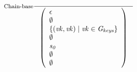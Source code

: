 \documentclass[11pt,a4paper]{article}
\newcommand{\var}[1]{\mathit{#1}}
\newcommand{\Gkeys}{\var{G_{keys}}}
\begin{document}
\begin{figure}
  \centering
  \begin{equation}
    \label{eq:rule:chain-base}
    \inference[Chain-base]
    {}
    {\left(
        \begin{array}{l}
          \epsilon\\
          \var{\emptyset}\\
          \var{\{ (\var{vk}, \var{vk}) \mid \var{vk} \in \Gkeys\}}\\
          \emptyset\\
          \var{s_0}\\
          \var{\emptyset}\\
          \var{\emptyset}
        \end{array}
      \right)
    }
  \end{equation}


\end{figure}
\end{document}
